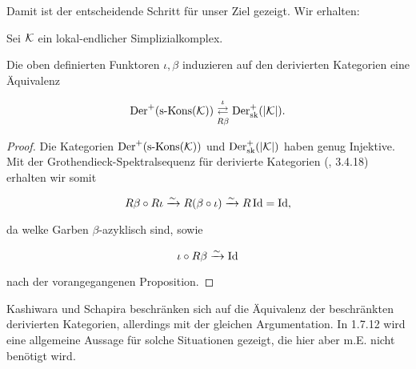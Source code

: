 Damit ist der entscheidende Schritt für unser Ziel gezeigt. Wir
erhalten:

\begin{theorem}
  Sei $\mathcal{K}$ ein lokal-endlicher Simplizialkomplex. %

  Die oben definierten Funktoren $\iota, \beta$ induzieren auf den
  derivierten Kategorien eine Äquivalenz

  \[ \operatorname{Der}^+(\operatorname{s-Kons}(\mathcal{K})) \mathrel{\mathop{\rightleftarrows}^{\iota}_{R \beta}} \operatorname{Der}^+_{\mathrm{sk}}(|\mathcal{K}|). \]
\end{theorem}
\begin{proof}
  Die Kategorien $\operatorname{Der}^+(\operatorname{s-Kons}(\mathcal{K}))$ und $\operatorname{Der}^+_{\mathrm{sk}}(|\mathcal{K}|)$ haben genug
  Injektive.  Mit der Grothendieck-Spektralsequenz für derivierte
  Kategorien (\cite{TD}, 3.4.18) erhalten wir somit

  \[ R\beta \circ R\iota \xrightarrow{\sim} R(\beta \circ \iota) \xrightarrow{\sim} R \operatorname{Id} = \operatorname{Id}, \]

  da welke Garben $\beta$-azyklisch sind, sowie

  \[ \iota \circ R \beta \xrightarrow{\sim} \operatorname{Id} \]

  nach der vorangegangenen Proposition.
\end{proof}
\begin{bem}
  Kashiwara und Schapira beschränken sich auf die Äquivalenz der
  beschränkten derivierten Kategorien, allerdings mit der gleichen
  Argumentation. In \cite{KS} 1.7.12 wird eine allgemeine Aussage für
  solche Situationen gezeigt, die hier aber m.E. nicht benötigt wird.
\end{bem}


